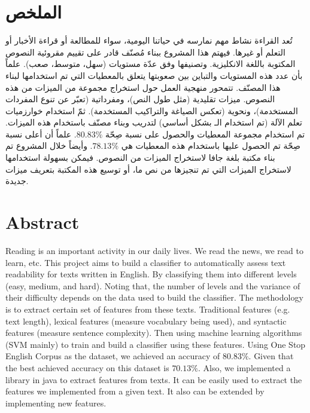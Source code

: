 

\section*{الملخص}
تُعد القراءة نشاط مهم نمارسه في حياتنا اليومية،
سواء للمطالعة أو قراءة الأخبار أو التعلم أو غيرها.
فيهتم هذا المشروع ببناء مُصنّف قادر على تقييم مقروئية النصوص المكتوبة باللغة الانكليزية.
وتصنيفها وفق عدّة مستويات (سهل، متوسط، صعب).
علماً بأن عدد هذه المستويات والتباين بين صعوبتها يتعلق بالمعطيات التي تم استخدامها لبناء هذا المصنّف.
تتمحور منهجية العمل حول استخراج مجموعة من الميزات من هذه النصوص.
ميزات تقليدية (مثل طول النص)، ومفرداتية (تعبّر عن تنوع المفردات المستخدمة)، ونحوية (تعكس الصياغة والتراكيب المستخدمة).
ثمّ استخدام خوارزميات تعلم الآلة (تم استخدام الـ  بشكل أساسي) لتدريب وبناء مصنّف باستخدام هذه الميزات.
تم استخدام مجموعة المعطيات  والحصول على نسبة صِحّة $80.83\%$.
علماً أن أعلى نسبة صِحّة تم الحصول عليها باستخدام هذه المعطيات هي $78.13\%$.
وأيضاً خلال المشروع تم بناء مكتبة بلغة جافا لاستخراج الميزات من النصوص.
فيمكن بسهولة استخدامها لاستخراج الميزات التي تم تنجيزها من نص ما، أو توسيع هذه المكتبة بتعريف ميزات جديدة.


\vfill
{}
\section*{Abstract}

Reading is an important activity in our daily lives.
We read the news, we read to learn, etc.
This project aims to build a classifier to automatically assess text readability for texts written in English.
By classifying them into different levels (easy, medium, and hard).
Noting that, the number of levels and the variance of their difficulty depends on the data used to build the classifier.
The methodology is to extract certain set of features from these texts.
Traditional features (e.g. text length), lexical features (measure vocabulary being used),
and syntactic features (measure sentence complexity).
Then using machine learning algorithms (SVM mainly) to train and build a classifier using these features.
Using One Stop English Corpus as the dataset, we achieved an accuracy of $80.83\%$.
Given that the best achieved accuracy on this dataset is $70.13\%$.
Also, we implemented a library in java to extract features from texts.
It can be easily used to extract the features we implemented from a given text.
It also can be extended by implementing new features.






